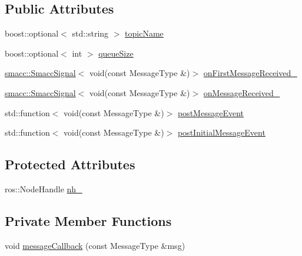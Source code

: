\subsection*{Public Attributes}
\begin{DoxyCompactItemize}
\item 
boost\+::optional$<$ std\+::string $>$ \hyperlink{classsmacc_1_1client__bases_1_1SmaccSubscriberClient_aeadf21a09412c6c9488e5acd50fb4f40}{topic\+Name}
\item 
boost\+::optional$<$ int $>$ \hyperlink{classsmacc_1_1client__bases_1_1SmaccSubscriberClient_a67f03f081d83476cdb7fd631b6aba450}{queue\+Size}
\item 
\hyperlink{classsmacc_1_1SmaccSignal}{smacc\+::\+Smacc\+Signal}$<$ void(const Message\+Type \&)$>$ \hyperlink{classsmacc_1_1client__bases_1_1SmaccSubscriberClient_af1ec022065a2df3faabe40768f8b2e22}{on\+First\+Message\+Received\+\_\+}
\item 
\hyperlink{classsmacc_1_1SmaccSignal}{smacc\+::\+Smacc\+Signal}$<$ void(const Message\+Type \&)$>$ \hyperlink{classsmacc_1_1client__bases_1_1SmaccSubscriberClient_a04469577ec95e2f6c04cd4dca87dfc08}{on\+Message\+Received\+\_\+}
\item 
std\+::function$<$ void(const Message\+Type \&)$>$ \hyperlink{classsmacc_1_1client__bases_1_1SmaccSubscriberClient_ad71ae0708e8a3ea321de985076d8b0ac}{post\+Message\+Event}
\item 
std\+::function$<$ void(const Message\+Type \&)$>$ \hyperlink{classsmacc_1_1client__bases_1_1SmaccSubscriberClient_ac184f4c0a6e924ceb9eecc71d6252106}{post\+Initial\+Message\+Event}
\end{DoxyCompactItemize}
\subsection*{Protected Attributes}
\begin{DoxyCompactItemize}
\item 
ros\+::\+Node\+Handle \hyperlink{classsmacc_1_1client__bases_1_1SmaccSubscriberClient_a401d2476e89e27acc2e905acd701f053}{nh\+\_\+}
\end{DoxyCompactItemize}
\subsection*{Private Member Functions}
\begin{DoxyCompactItemize}
\item 
void \hyperlink{classsmacc_1_1client__bases_1_1SmaccSubscriberClient_acf85b80439aff5cf2bfa0649e9e45654}{message\+Callback} (const Message\+Type \&msg)
\end{DoxyCompactItemize}
